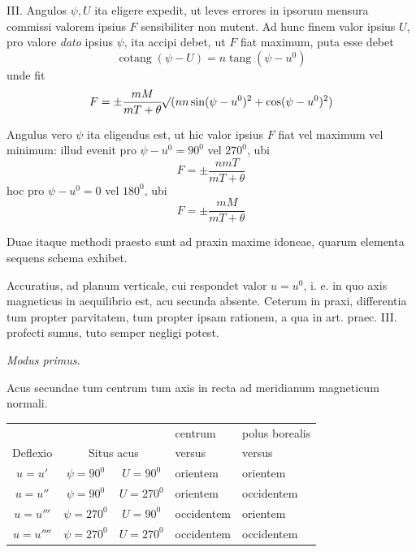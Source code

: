 III. Angulos $\psi,U$ ita eligere expedit, ut leves errores in ipsorum mensura commissi valorem ipsius $F$ sensibiliter non mutent. Ad hunc finem valor ipsius $U$, pro valore \textit{dato} ipsius $\psi$, ita accipi debet, ut $F$ fiat maximum, puta esse debet
\[
\operatorname{cotang}(\psi-U)=n\operatorname{tang}(\psi-u^0)
\]
unde fit
\[
F=\pm\frac{mM}{mT+\theta}\mathord{{}^{}\!\surd}(nn\sin(\psi-u^0)^2+\cos(\psi-u^0)^2)
\]

Angulus vero $\psi$ ita eligendus est, ut hic valor ipsius $F$ fiat vel maximum vel minimum: illud evenit pro $\psi-u^0=90^0$ vel $270^0$, ubi
\[
F=\pm\frac{nmT}{mT+\theta}
\]
hoc pro $\psi-u^0=0$ vel $180^0$, ubi
\[
F=\pm\frac{mM}{mT+\theta}
\]

Duae itaque methodi praesto sunt ad praxin maxime idoneae, quarum elementa sequens schema exhibet.

\expandafter\def\csname HistoricalNoteText11\endcsname{Accuratius, ad planum verticale, cui respondet valor $u=u^0$, i. e. in quo axis magneticus in aequilibrio est, acu secunda absente. Ceterum in praxi, differentia tum propter parvitatem, tum propter ipsam rationem, a qua in art. praec. III. profecti sumus, tuto semper negligi potest.}
\begin{center}
\textit{Modus primus.}

Acus secundae tum centrum tum axis in recta ad meridianum magneticum normali.

\begin{tabular}{c|c|c|l|l}
& & &centrum&polus borealis\\
Deflexio&\multicolumn{2}{c|}{Situs acus}&versus&versus\\\hline
$u=u'$&$\psi=90^0$&$U=90^0$&orientem&orientem\\
$u=u''$&$\psi=90^0$&$U=270^0$&orientem&occidentem\\
$u=u'''$&$\psi=270^0$&$U=90^0$&occidentem&orientem\\
$u=u''''$&$\psi=270^0$&$U=270^0$&occidentem&occidentem
\end{tabular}
\end{center}
